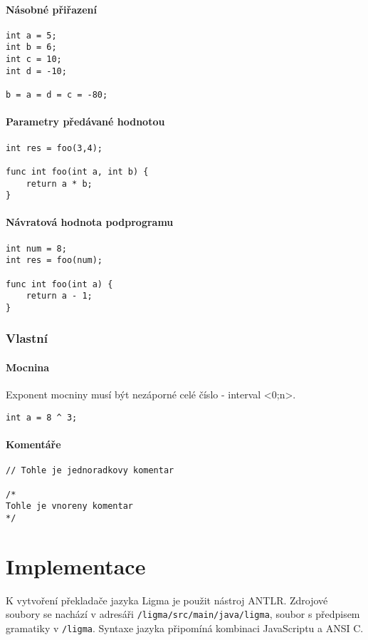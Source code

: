 \documentclass[czech, oth, kiv, he, iso690numb, viewonly]{fasthesis}
\begin{document}
\subsubsection{Násobné přiřazení}
\begin{lstlisting}[]
int a = 5;
int b = 6;
int c = 10;
int d = -10;

b = a = d = c = -80;
\end{lstlisting}

\subsubsection{Parametry předávané hodnotou}
\begin{lstlisting}[]  
int res = foo(3,4);
    
func int foo(int a, int b) {
    return a * b;
}
\end{lstlisting}

\subsubsection{Návratová hodnota podprogramu}
\begin{lstlisting}[]
int num = 8;    
int res = foo(num);

func int foo(int a) {
    return a - 1;
}
\end{lstlisting}

\subsection{Vlastní}

\subsubsection{Mocnina}
Exponent mocniny musí být nezáporné celé číslo - interval <0;n>.
\begin{lstlisting}[]
int a = 8 ^ 3;    
\end{lstlisting}

\subsubsection{Komentáře}
\begin{lstlisting}[]
// Tohle je jednoradkovy komentar

/*
Tohle je vnoreny komentar
*/
\end{lstlisting}

\chapter{Implementace}
K vytvoření překladače jazyka Ligma je použit nástroj ANTLR. Zdrojové soubory se nachází v adresáři
\texttt{/ligma/src/main/java/ligma}, soubor s předpisem gramatiky v \texttt{/ligma}. Syntaxe jazyka
připomíná kombinaci JavaScriptu a ANSI C.
\end{document}
